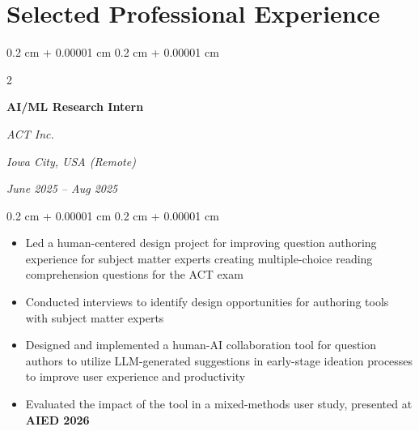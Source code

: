 \documentclass[10pt, letterpaper]{article}
\newenvironment{highlights}{
    \begin{itemize}[
        topsep=0.10 cm,
        parsep=0.10 cm,
        partopsep=0pt,
        itemsep=0pt,
        leftmargin=0.4 cm + 10pt
    ]
}{
    \end{itemize}
} %
\newenvironment{onecolentry}{
    \begin{adjustwidth}{
        0.2 cm + 0.00001 cm
    }{
        0.2 cm + 0.00001 cm
    }
}{
    \end{adjustwidth}
} %
\newenvironment{twocolentry}[2][]{
    \onecolentry
    \def\secondColumn{#2}
    \setcolumnwidth{\fill, 4.5 cm}
    \begin{paracol}{2}
}{
    \switchcolumn \raggedleft \secondColumn
    \end{paracol}
    \endonecolentry
} %
\begin{document}
    \section{Selected Professional Experience}



        \begin{twocolentry}{
        \textit{Iowa City, USA (Remote)}    
            
        \textit{June 2025 – Aug 2025}}
            \textbf{AI/ML Research Intern}
            
            \textit{ACT Inc.}
        \end{twocolentry}

        \vspace{0.10 cm}
        \begin{onecolentry}
            \begin{highlights}

                \item Led a human-centered design project for improving question authoring experience for subject matter experts creating multiple-choice reading comprehension questions for the ACT exam
                \item Conducted interviews to identify design opportunities for authoring tools with subject matter experts
                \item Designed and implemented a human-AI collaboration tool for question authors to utilize LLM-generated suggestions in early-stage ideation processes to improve user experience and productivity
                \item Evaluated the impact of the tool in a mixed-methods user study, presented at \textbf{AIED 2026}~\cite{aied2026}
            \end{highlights}
        \end{onecolentry}
\end{document}
